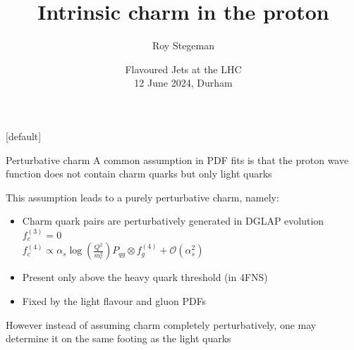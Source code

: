 \documentclass[aspectratio=43, 8pt,t]{beamer}
\title{Intrinsic charm in the proton}
\date{Flavoured Jets at the LHC  \\[0.1cm] 12 June 2024, Durham}
\author{Roy Stegeman}
\institute{\small The University of Edinburgh}
\begin{document}
{
\begin{frame}
  \titlepage
\end{frame}
}

[default]



\newcommand{\nn}{\vspace*{1em}}










\begin{frame}{Perturbative charm}
  A common assumption in PDF fits is that the proton wave function does not contain charm quarks but only light quarks

  \vspace*{1em}
  This assumption leads to a purely perturbative charm, namely:
  \begin{itemize}
    \item Charm quark pairs are perturbatively generated in DGLAP evolution\\
    $f_c^{(3)}=0$ \\
    $f_c^{(4)}\propto \alpha_s \log\left(\frac{Q^2}{m_c^2}\right)P_{qg} \otimes f_g^{(4)} + \mathcal{O}(\alpha_s^2)$

    \item Present only above the heavy quark threshold (in 4FNS)

    \item Fixed by the light flavour and gluon PDFs
  \end{itemize}

  \vspace*{1em}
  However instead of assuming charm completely perturbatively, one may determine it on the same footing as the light quarks
\end{frame}
\end{document}
